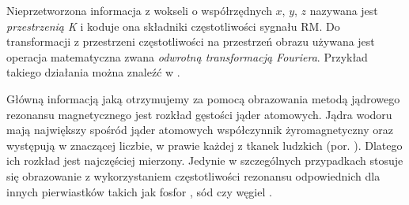 Nieprzetworzona informacja z wokseli o współrzędnych $x$, $y$, $z$ nazywana jest \textit{przestrzenią K} i koduje ona składniki częstotliwości sygnału RM. Do transformacji z przestrzeni częstotliwości na przestrzeń obrazu używana jest operacja matematyczna zwana \textit{odwrotną transformacją Fouriera}. Przykład takiego działania można znaleźć w \cite{Q&AinMRI}.

Główną informacją jaką otrzymujemy za pomocą obrazowania metodą jądrowego rezonansu magnetycznego jest rozkład gęstości jąder atomowych. Jądra wodoru mają największy spośród jąder atomowych współczynnik żyromagnetyczny oraz występują w znaczącej liczbie, w prawie każdej z tkanek ludzkich (por. \cite{RM2015}). Dlatego ich rozkład jest najczęściej mierzony. Jedynie w szczególnych przypadkach stosuje się obrazowanie z wykorzystaniem częstotliwości rezonansu odpowiednich dla innych pierwiastków takich jak fosfor \cite{Sun2016}, sód \cite{Summers1991} czy węgiel \cite{Dria2002}. 

